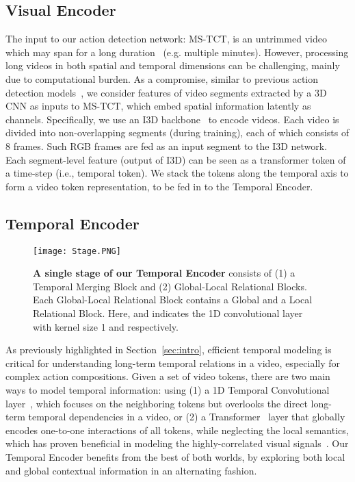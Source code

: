 \documentclass[10pt,twocolumn,letterpaper]{article}
\begin{document}
\subsection{Visual Encoder} 
The input to our action detection network: MS-TCT, is an untrimmed video which may span for a long duration~\cite{dai2020toyota} (e.g. multiple minutes). 
However, processing long videos in both spatial and temporal dimensions can be challenging, mainly due to computational burden. As a compromise, similar to previous action detection models~\cite{MLAD,Dai_2021_WACV,TGM1}, we consider features of video segments extracted by a 3D CNN as inputs to MS-TCT, which embed spatial information latently as channels. 
Specifically, we use an I3D backbone~\cite{i3d} to encode videos. Each video is divided into  non-overlapping segments (during training), each of which consists of 8 frames. Such RGB frames are fed as an input segment to the I3D network.
Each segment-level feature (output of I3D) can be seen as a transformer token of a time-step (i.e., temporal token).
We stack the tokens along the temporal axis to form a  video token representation, to be fed in to the Temporal Encoder.

\subsection{Temporal Encoder}
\begin{figure}[ht!]
\centering
\texttt{[image: Stage.PNG]}
\caption{\textbf{A single stage of our Temporal Encoder} consists of (1) a Temporal Merging Block and (2)  Global-Local Relational Blocks. Each Global-Local Relational Block contains a Global and a Local Relational Block. Here,  and  indicates the 1D convolutional layer with kernel size 1 and  respectively.
}
\label{fig:stage}
\end{figure}
As previously highlighted in Section~\ref{sec:intro}, efficient temporal modeling is critical for understanding long-term temporal relations in a video, especially for complex action compositions. 
Given a set of video tokens, there are two main ways to model temporal information: using (1) a 1D Temporal Convolutional layer~\cite{lea2017temporal}, which focuses on the neighboring tokens but overlooks the direct long-term temporal dependencies in a video, or
(2) a Transformer~\cite{transformer} layer that globally encodes one-to-one interactions of all tokens, while neglecting the local semantics, which has proven beneficial in modeling the highly-correlated visual signals~\cite{hubel1962receptive,fukushima1975cognitron}. 
Our Temporal Encoder benefits from the best of both worlds, by exploring both local and global contextual information in an alternating fashion. 
\end{document}
